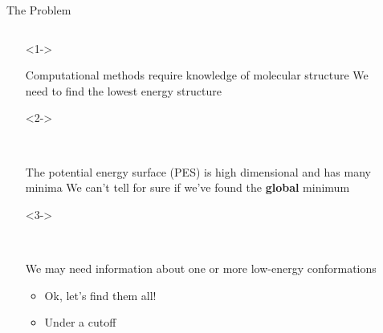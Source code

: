 \documentclass[10pt]{beamer}
\begin{document}
{%
\begin{frame}[fragile]{The Problem}
    \begin{columns}{}
        \begin{column}{0.6\textwidth}
            \begin{itemize}
              \item[]<1->{
             	\begin{block}{Computational methods require knowledge of molecular structure}
                    We need to find the lowest energy structure
             	\end{block}
              }
              \item[]<2->{
             	~
             	\begin{block}{The potential energy surface (PES) is high dimensional and has many minima}
                    We can't tell for sure if we've found the \alert{\textbf{global}} minimum
             	\end{block}
              }
              \item[]<3->{
             	~
            	\begin{block}{We may need information about one or more low-energy conformations}
                    \begin{itemize}[leftmargin=*]
                        \item<3-> Ok, let's find them all!
                        \item<4-> Under a cutoff
                    \end{itemize}
            	\end{block}
              }
            \end{itemize}
           \end{column}
           \begin{column}{0.45\textwidth}
		    \begin{overprint}

\end{overprint}
\end{column}
\end{columns}
\end{frame}}
\end{document}
